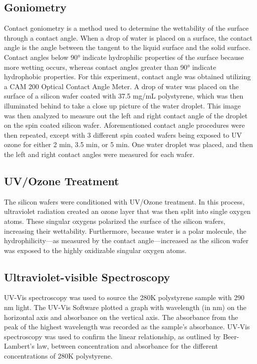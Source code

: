 \documentclass{article}
\begin{document}
\begin{multicols}{2}
            \subsection{Goniometry}
                Contact goniometry is a method used to determine the wettability of the surface through a contact angle. When a drop of water is placed on a surface, the contact angle is the angle between the tangent to the liquid surface and the solid surface. Contact angles below 90° indicate hydrophilic properties of the surface because more wetting occurs, whereas contact angles greater than 90° indicate hydrophobic properties. For this experiment, contact angle was obtained utilizing a CAM 200 Optical Contact Angle Meter. A drop of water was placed on the surface of a silicon wafer coated with 37.5 mg/mL polystyrene, which was then illuminated behind to take a close up picture of the water droplet. This image was then analyzed to measure out the left and right contact angle of the droplet on the spin coated silicon wafer. Aforementioned contact angle procedures were then repeated, except with 3 different spin coated wafers being exposed to UV ozone for either 2 min, 3.5 min, or 5 min. One water droplet was placed, and then the left and right contact angles were measured for each wafer. 
            
            \subsection{UV/Ozone Treatment}
                The silicon wafers were conditioned with UV/Ozone treatment. In this process, ultraviolet radiation created an ozone layer that was then split into single oxygen atoms. These singular oxygens polarized the surface of the silicon wafers, increasing their wettability. Furthermore, because water is a polar molecule, the hydrophilicity—as measured by the contact angle—increased as the silicon wafer was exposed to the highly oxidizable singular oxygen atoms. 

            \subsection{Ultraviolet-visible Spectroscopy}
                UV-Vis spectroscopy was used to source the 280K polystyrene sample with 290 nm light. The UV-Vis Software plotted a graph with wavelength (in nm) on the horizontal axis and absorbance on the vertical axis. The absorbance from the peak of the highest wavelength was recorded as the sample’s absorbance. UV-Vis spectroscopy was used to confirm the linear relationship, as outlined by Beer-Lambert’s law, between concentration and absorbance for the different concentrations of 280K polystyrene.


\end{multicols}
\end{document}
